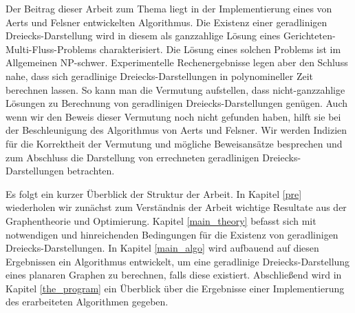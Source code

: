 Der Beitrag dieser Arbeit zum Thema liegt in der Implementierung eines von Aerts und Felsner entwickelten Algorithmus. Die Existenz einer geradlinigen Dreiecks-Darstellung wird in diesem als ganzzahlige Lösung eines Gerichteten-Multi-Fluss-Problems charakterisiert. Die Lösung eines solchen Problems ist im Allgemeinen NP-schwer. Experimentelle Rechenergebnisse legen aber den Schluss nahe, dass sich geradlinige Dreiecks-Darstellungen in polynomineller Zeit berechnen lassen. So kann man die Vermutung aufstellen, dass nicht-ganzzahlige Lösungen zu Berechnung von geradlinigen Dreiecks-Darstellungen genügen. Auch wenn wir den Beweis dieser Vermutung noch nicht gefunden haben, hilft sie bei der Beschleunigung des Algorithmus von Aerts und Felsner. Wir werden Indizien für die Korrektheit der Vermutung und mögliche Beweisansätze besprechen und zum Abschluss die Darstellung von errechneten geradlinigen Dreiecks-Darstellungen betrachten. 

Es folgt ein kurzer Überblick der Struktur der Arbeit. In Kapitel \ref{pre} wiederholen wir zunächst zum Verständnis der Arbeit wichtige Resultate aus der Graphentheorie und Optimierung. Kapitel \ref{main_theory} befasst sich mit notwendigen und hinreichenden Bedingungen für die Existenz von geradlinigen Dreiecks-Darstellungen. In Kapitel \ref{main_algo} wird aufbauend auf diesen Ergebnissen ein Algorithmus entwickelt, um eine geradlinige Dreiecks-Darstellung eines planaren Graphen zu berechnen, falls diese existiert. Abschließend wird in Kapitel \ref{the_program} ein Überblick über die Ergebnisse einer Implementierung des erarbeiteten Algorithmen gegeben.


